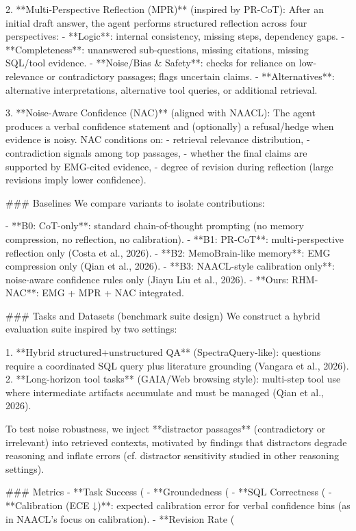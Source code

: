 2. **Multi-Perspective Reflection (MPR)** (inspired by PR-CoT):  
   After an initial draft answer, the agent performs structured reflection across four perspectives:
   - **Logic**: internal consistency, missing steps, dependency gaps.  
   - **Completeness**: unanswered sub-questions, missing citations, missing SQL/tool evidence.  
   - **Noise/Bias & Safety**: checks for reliance on low-relevance or contradictory passages; flags uncertain claims.  
   - **Alternatives**: alternative interpretations, alternative tool queries, or additional retrieval.

3. **Noise-Aware Confidence (NAC)** (aligned with NAACL):  
   The agent produces a verbal confidence statement and (optionally) a refusal/hedge when evidence is noisy. NAC conditions on:
   - retrieval relevance distribution,  
   - contradiction signals among top passages,  
   - whether the final claims are supported by EMG-cited evidence,  
   - degree of revision during reflection (large revisions imply lower confidence).

### Baselines  
We compare variants to isolate contributions:

- **B0: CoT-only**: standard chain-of-thought prompting (no memory compression, no reflection, no calibration).  
- **B1: PR-CoT**: multi-perspective reflection only (Costa et al., 2026).  
- **B2: MemoBrain-like memory**: EMG compression only (Qian et al., 2026).  
- **B3: NAACL-style calibration only**: noise-aware confidence rules only (Jiayu Liu et al., 2026).  
- **Ours: RHM-NAC**: EMG + MPR + NAC integrated.

### Tasks and Datasets (benchmark suite design)  
We construct a hybrid evaluation suite inspired by two settings:

1. **Hybrid structured+unstructured QA** (SpectraQuery-like): questions require a coordinated SQL query plus literature grounding (Vangara et al., 2026).  
2. **Long-horizon tool tasks** (GAIA/Web browsing style): multi-step tool use where intermediate artifacts accumulate and must be managed (Qian et al., 2026).

To test noise robustness, we inject **distractor passages** (contradictory or irrelevant) into retrieved contexts, motivated by findings that distractors degrade reasoning and inflate errors (cf. distractor sensitivity studied in other reasoning settings).

### Metrics  
- **Task Success (%
- **Groundedness (%
- **SQL Correctness (%
- **Calibration (ECE ↓)**: expected calibration error for verbal confidence bins (as in NAACL’s focus on calibration).  
- **Revision Rate (%

